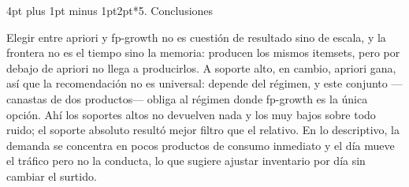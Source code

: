 \documentclass[12pt,twocolumn]{article}
\makeatletter
\renewcommand\section{\@startsection{section}{1}{\z@}
  {4pt plus 1pt minus 1pt}{2pt}{\normalfont\large\bfseries}}
\makeatother
\begin{document}
\section*{5. Conclusiones}

Elegir entre apriori y fp-growth no es cuestión de resultado sino de escala, y la
frontera no es el tiempo sino la memoria: producen los mismos itemsets, pero por debajo
de \cifraSoporteAprioriCompleta{} apriori no llega a producirlos. A soporte alto, en cambio, apriori gana, así
que la recomendación no es universal: depende del régimen, y este conjunto ---canastas
de dos productos--- obliga al régimen donde fp-growth es la única opción. Ahí los
soportes altos no devuelven nada y los muy bajos sobre todo ruido; el soporte absoluto
resultó mejor filtro que el relativo. En lo descriptivo, la demanda se concentra en
pocos productos de consumo inmediato y el día mueve el tráfico pero no la conducta, lo
que sugiere ajustar inventario por día sin cambiar el surtido.
\end{document}
